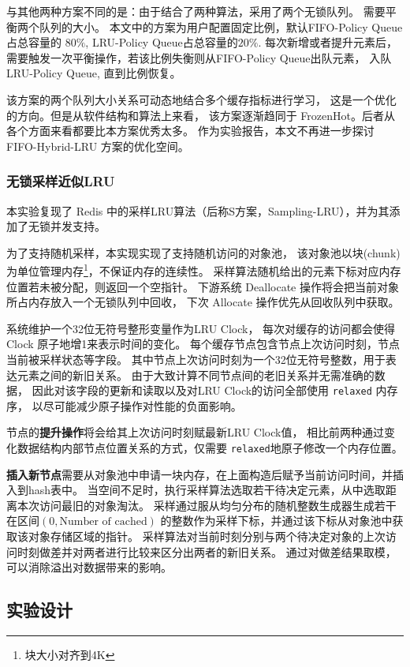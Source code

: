 与其他两种方案不同的是：由于结合了两种算法，采用了两个无锁队列。
需要平衡两个队列的大小。
本文中的方案为用户配置固定比例，默认FIFO-Policy Queue占总容量的 $80\%$,
LRU-Policy Queue占总容量的$20\%$. 每次新增或者提升元素后，
需要触发一次平衡操作，若该比例失衡则从FIFO-Policy Queue出队元素，
入队LRU-Policy Queue, 直到比例恢复。

该方案的两个队列大小关系可动态地结合多个缓存指标进行学习，
这是一个优化的方向。但是从软件结构和算法上来看，
该方案逐渐趋同于 FrozenHot。后者从各个方面来看都要比本方案优秀太多。
作为实验报告，本文不再进一步探讨 FIFO-Hybrid-LRU 方案的优化空间。

\subsubsection{无锁采样近似LRU}

本实验复现了 Redis 中的采样LRU算法（后称S方案，Sampling-LRU），并为其添加了无锁并发支持。

为了支持随机采样，本实现实现了支持随机访问的对象池，
该对象池以块(chunk)为单位管理内存\footnote{块大小对齐到4K}，不保证内存的连续性。
采样算法随机给出的元素下标对应内存位置若未被分配，则返回一个空指针。
下游系统 Deallocate 操作将会把当前对象所占内存放入一个无锁队列中回收，
下次 Allocate 操作优先从回收队列中获取。

系统维护一个32位无符号整形变量作为LRU Clock，
每次对缓存的访问都会使得Clock 原子地增1来表示时间的变化。
每个缓存节点包含节点上次访问时刻，节点当前被采样状态等字段。
其中节点上次访问时刻为一个32位无符号整数，用于表达元素之间的新旧关系。
由于大致计算不同节点间的老旧关系并无需准确的数据，
因此对该字段的更新和读取以及对LRU Clock的访问全部使用 \verb|relaxed| 内存序，
以尽可能减少原子操作对性能的负面影响。

节点的\textbf{提升操作}将会给其上次访问时刻赋最新LRU Clock值，
相比前两种通过变化数据结构内部节点位置关系的方式，仅需要 \verb|relaxed|地原子修改一个内存位置。

\textbf{插入新节点}需要从对象池中申请一块内存，在上面构造后赋予当前访问时间，并插入到hash表中。
当空间不足时，执行采样算法选取若干待决定元素，从中选取距离本次访问最旧的对象淘汰。
采样通过服从均匀分布的随机整数生成器生成若干在区间$\allowbreak (0, \mbox{Number of cached})$
的整数作为采样下标，并通过该下标从对象池中获取该对象存储区域的指针。
采样算法对当前时刻分别与两个待决定对象的上次访问时刻做差并对两者进行比较来区分出两者的新旧关系。
通过对做差结果取模，可以消除溢出对数据带来的影响。

\subsection{实验设计}

